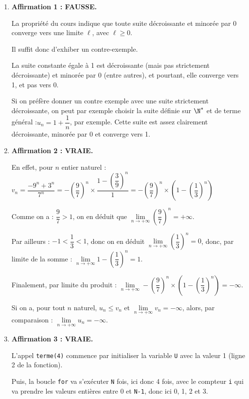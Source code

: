 \medskip

\begin{enumerate}
	\item \textbf{Affirmation 1 : FAUSSE.}

	La propriété du cours indique que toute suite décroissante et minorée par 0 converge vers une limite $\ell$, avec $\ell\geqslant 0$.

	Il suffit donc d'exhiber un contre-exemple.

	La suite constante égale à 1 est décroissante (mais pas strictement décroissante) et minorée par 0 (entre autres), et pourtant, elle converge vers 1, et pas vers 0.

	Si on préfère donner un contre exemple avec une suite strictement décroissante, on peut par exemple choisir la suite définie sur $\N^*$ et de terme général :\quad $u_n = 1 + \dfrac{1}{n}$, par exemple. Cette suite est assez clairement décroissante, minorée par 0 et converge vers 1.

	\item \textbf{Affirmation 2 : VRAIE.}

	En effet, pour $n$ entier naturel :\quad $v_n = \dfrac{-9^n + 3^n}{7^n} = -\left(\dfrac{9}{7}\right)^n \times \dfrac{1 - \left(\dfrac{3}{9}\right)^n }{1} = -\left(\dfrac{9}{7}\right)^n \times \left(1 - \left(\dfrac{1}{3}\right)^n\right)$

	Comme on a : $\dfrac{9}{7}>1$, on en déduit que $\lim\limits_{n \to +\infty} \left(\dfrac{9}{7}\right)^n = +\infty.$

	Par ailleurs : $-1 < \dfrac{1}{3}<1$, donc on en déduit $\lim\limits_{n \to +\infty} \left(\dfrac{1}{3}\right)^n = 0$, donc, par limite de la somme : $\lim\limits_{n \to +\infty} 1 - \left(\dfrac{1}{3}\right)^n = 1$.

	Finalement, par limite du produit : $\lim\limits_{n \to +\infty} -\left(\dfrac{9}{7}\right)^n \times \left(1 - \left(\dfrac{1}{3}\right)^n\right) = -\infty$.

	Si on a, pour tout $n$ naturel, $u_n \leqslant v_n$ et $\lim\limits_{n \to +\infty} v_n = -\infty$, alors, par comparaison : \quad $\lim\limits_{n \to + \infty} u_n = -\infty$.

	\item \textbf{Affirmation 3 : VRAIE.}

	L'appel \texttt{terme(4)} commence par initialiser la variable \texttt{U} avec la valeur 1 (ligne 2 de la fonction).

	Puis, la boucle \texttt{for} va s'exécuter \texttt{N} fois, ici donc 4 fois, avec le compteur \texttt{i} qui va prendre les valeurs entières entre 0 et \texttt{N-1}, donc ici 0, 1, 2 et 3.


\end{enumerate}
